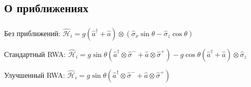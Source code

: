 \documentclass[aspectratio=169, 13pt]{beamer}
\begin{document}
\subsection*{О приближениях}
\begin{frame}[noframenumbering, c]\frametitle{\secname}\framesubtitle{\subsecname}

\begin{block}{Без приближений:}
$\mathcal{\hat H}_i = g (\hat a^\dag + \hat a) \otimes \left( \hat \sigma_x \sin\theta-  \hat\sigma_z \cos\theta \right)$
\end{block}

\begin{block}{Стандартный RWA:}
$\mathcal{\hat H}_i = g \sin\theta \left(\hat a^\dag \otimes \hat \sigma^- + \hat a \otimes \hat \sigma^+\right) - g\cos\theta (\hat a^\dag + \hat a) \otimes \hat\sigma_z $
\end{block}

\begin{block}{Улучшенный RWA:}
$\mathcal{\hat H}_i = g \sin\theta \left(\hat a^\dag \otimes \hat \sigma^- + \hat a \otimes \hat \sigma^+\right) $
\end{block}

\end{frame}
\end{document}

